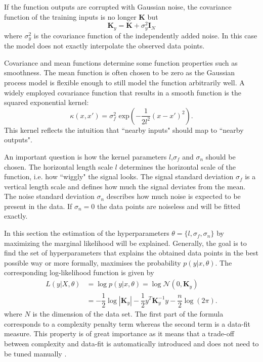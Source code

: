 \documentclass[../main.tex]{subfiles}
\begin{document}
If the function outputs are corrupted with Gaussian noise, the covariance function of the training inputs is no longer $\mathbf{K}$ but
\begin{equation}
    \mathbf{K}_y = \mathbf{K} + \sigma_y^2\mathbf{I}_N
\end{equation}
where $\sigma_y^2$ is the covariance function of the independently added noise. In this case the model does not exactly interpolate the observed data points.\par
Covariance and mean functions determine some function properties such as smoothness. The mean function is often chosen to be zero as the Gaussian process model is flexible enough to still model the function arbitrarily well. A widely employed covariance function that results in a smooth function is the squared exponential kernel:
\begin{equation}\label{eq:sqexp}
    \kappa(x,x') = \sigma^2_f \text{ exp}(-\dfrac{1}{2l^2}(x-x')^2).
\end{equation}
This kernel reflects the intuition that ``nearby inputs" should map to ``nearby outputs". \par 
An important question is how the kernel parameters $l$,$\sigma_f$ and $\sigma_n$ should be chosen. The horizontal length scale $l$ determines the horizontal scale of the function, i.e. how ``wiggly" the signal looks. The signal standard deviation $\sigma_f$ is a vertical length scale and defines how much the signal deviates from the mean. The noise standard deviation $\sigma_n$ describes how much noise is expected to be present in the data. If $\sigma_n = 0$ the data points are noiseless and will be fitted exactly. \par
In this section the estimation of the hyperparameters $\theta = \{l,\sigma_f, \sigma_n\}$ by maximizing the marginal likelihood will be explained. Generally, the goal is to find the set of hyperparameters that explains the obtained data points in the best possible way or more formally, maximises the probability $p(y|x,\theta)$. The corresponding log-likelihood function is given by
\begin{align}
    L(y|X, \theta) &= \log p(y|x,\theta) = \log \mathcal{N}(0,\mathbf{K}_y)\\
    &= -\dfrac{1}{2} \log|\mathbf{K}_y|-\dfrac{1}{2}y^T\mathbf{K}_y^{-1}y-\dfrac{n}{2}\log(2\pi).
\end{align}
where $N$ is the dimension of the data set. The first part of the formula corresponds to a complexity penalty term whereas the second term is a data-fit measure. This property is of great importance as it means that a trade-off between complexity and data-fit is automatically introduced and does not need to be tuned manually \cite{rasmussen2006gaussian}. 
\end{document}
